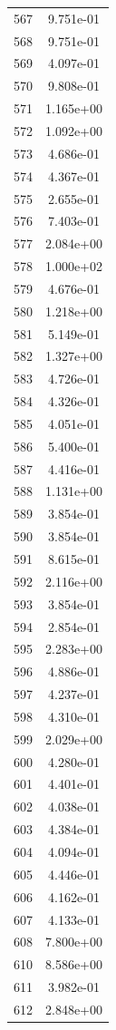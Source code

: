 \documentclass[12pt]{article}
\begin{document}
\begin{longtable}{@{}cc@{}}
567 & 9.751e-01 \\
568 & 9.751e-01 \\
569 & 4.097e-01 \\
570 & 9.808e-01 \\
571 & 1.165e+00 \\
572 & 1.092e+00 \\
573 & 4.686e-01 \\
574 & 4.367e-01 \\
575 & 2.655e-01 \\
576 & 7.403e-01 \\
577 & 2.084e+00 \\
578 & 1.000e+02 \\
579 & 4.676e-01 \\
580 & 1.218e+00 \\
581 & 5.149e-01 \\
582 & 1.327e+00 \\
583 & 4.726e-01 \\
584 & 4.326e-01 \\
585 & 4.051e-01 \\
586 & 5.400e-01 \\
587 & 4.416e-01 \\
588 & 1.131e+00 \\
589 & 3.854e-01 \\
590 & 3.854e-01 \\
591 & 8.615e-01 \\
592 & 2.116e+00 \\
593 & 3.854e-01 \\
594 & 2.854e-01 \\
595 & 2.283e+00 \\
596 & 4.886e-01 \\
597 & 4.237e-01 \\
598 & 4.310e-01 \\
599 & 2.029e+00 \\
600 & 4.280e-01 \\
601 & 4.401e-01 \\
602 & 4.038e-01 \\
603 & 4.384e-01 \\
604 & 4.094e-01 \\
605 & 4.446e-01 \\
606 & 4.162e-01 \\
607 & 4.133e-01 \\
608 & 7.800e+00 \\
610 & 8.586e+00 \\
611 & 3.982e-01 \\
612 & 2.848e+00 \\

\end{longtable}
\end{document}
